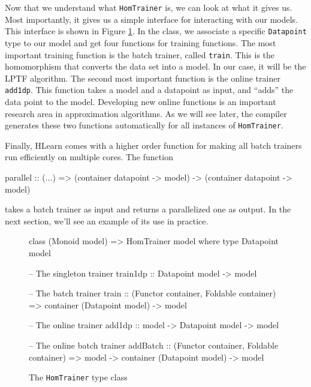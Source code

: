 \documentclass[tikz]{tmr}
\newcommand\h{\lstinline}
\newcommand\+{\mdoubleplus}
\begin{document}
Now that we understand what \h{HomTrainer} is, we can look at what it gives us.
Most importantly, it gives us a simple interface for interacting with our models.
This interface is shown in Figure \ref{alg:HomTrainer}.
In the class, we associate a specific \h{Datapoint} type to our model and get four functions for training functions.
The most important training function is the batch trainer, called \h{train}.
This is the homomorphism that converts the data set into a model.
In our case, it will be the LPTF algorithm.
The second most important function is the online trainer \h{add1dp}.
This function takes a model and a datapoint as input, and ``adds'' the data point to the model.
Developing new online functions is an important research area in approximation algorithms.
As we will see later, the compiler generates these two functions automatically for all instances of \h{HomTrainer}.

Finally, HLearn comes with a higher order function for making all batch trainers run efficiently on multiple cores.
The function
\begin{spec}
parallel :: (...) => 
    (container datapoint -> model) -> (container datapoint -> model)
\end{spec}
takes a batch trainer as input and returns a parallelized one as output.
In the next section, we'll see an example of its use in practice.



\begin{figure}
\caption{The \h{HomTrainer} type class}
\label{alg:HomTrainer}
\begin{code}
class (Monoid model) => HomTrainer model where
    type Datapoint model

    -- The singleton trainer
    train1dp :: Datapoint model -> model
    
    -- The batch trainer
    train :: (Functor container, Foldable container) => 
        container (Datapoint model) -> model

    -- The online trainer
    add1dp :: model -> Datapoint model -> model
    
    -- The online batch trainer
    addBatch :: (Functor container, Foldable container) =>  
        model -> container (Datapoint model) -> model
\end{code}
\end{figure}
\end{document}
